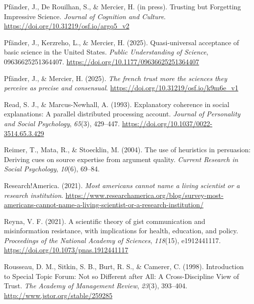 \documentclass[
  man,
  floatsintext,
  longtable,
  nolmodern,
  notxfonts,
  notimes,
  colorlinks=true,linkcolor=blue,citecolor=blue,urlcolor=blue]{apa7}
\newlength{\cslhangindent}
\newenvironment{CSLReferences}[2] %
 {\begin{list}{}{%
  \setlength{\itemindent}{0pt}
  \setlength{\leftmargin}{0pt}
  \setlength{\parsep}{0pt}
  \ifodd #1
   \setlength{\leftmargin}{\cslhangindent}
   \setlength{\itemindent}{-1\cslhangindent}
  \fi
  \setlength{\itemsep}{#2\baselineskip}}}
 {\end{list}}
\begin{document}
\begin{CSLReferences}{1}{0}
Pfänder, J., De Rouilhan, S., \& Mercier, H. (in press). Trusting but
Forgetting Impressive Science. \emph{Journal of Cognition and Culture}.
\url{https://doi.org/10.31219/osf.io/argq5_v2}

Pfänder, J., Kerzreho, L., \& Mercier, H. (2025). Quasi-universal
acceptance of basic science in the United States. \emph{Public
Understanding of Science}, 09636625251364407.
\url{https://doi.org/10.1177/09636625251364407}

Pfänder, J., \& Mercier, H. (2025). \emph{The french trust more the
sciences they perceive as precise and consensual}.
\url{https://doi.org/10.31219/osf.io/k9m6e_v1}

Read, S. J., \& Marcus-Newhall, A. (1993). Explanatory coherence in
social explanations: A parallel distributed processing account.
\emph{Journal of Personality and Social Psychology}, \emph{65}(3),
429--447. \url{https://doi.org/10.1037/0022-3514.65.3.429}

Reimer, T., Mata, R., \& Stoecklin, M. (2004). The use of heuristics in
persuasion: Deriving cues on source expertise from argument quality.
\emph{Current Research in Social Psychology}, \emph{10}(6), 69--84.

Research!America. (2021). \emph{Most americans cannot name a living
scientist or a research institution}.
\url{https://www.researchamerica.org/blog/survey-most-americans-cannot-name-a-living-scientist-or-a-research-institution/}

Reyna, V. F. (2021). A scientific theory of gist communication and
misinformation resistance, with implications for health, education, and
policy. \emph{Proceedings of the National Academy of Sciences},
\emph{118}(15), e1912441117.
\url{https://doi.org/10.1073/pnas.1912441117}

Rousseau, D. M., Sitkin, S. B., Burt, R. S., \& Camerer, C. (1998).
Introduction to Special Topic Forum: Not so Different after All: A
Cross-Discipline View of Trust. \emph{The Academy of Management Review},
\emph{23}(3), 393--404. \url{http://www.jstor.org/stable/259285}


\end{CSLReferences}
\end{document}
